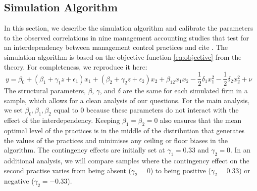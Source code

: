 \documentclass[12pt]{article}
\begin{document}
\subsection{Simulation Algorithm}

In this section, we describe the simulation algorithm and calibrate the parameters to the observed correlations in nine management accounting studies that test for an interdependency between management control practices and cite \citet{grabner_management_2013}. The simulation algorithm is based on the objective function \eqref{eq:objective} from the theory. For completeness, we reproduce it here:
\begin{equation*}
y  = \beta_0 + (\beta_{1} + \gamma_1 z + \epsilon_1) x_1 
						+ (\beta_{2} + \gamma_2 z  + \epsilon_2) x_2 
                        + \beta_{12} x_1 x_2 - \frac{1}{2}\delta_1 x^2_1 - \frac{1}{2}\delta_2 x^2_2 + \nu
\end{equation*}
The structural parameters, $\beta$, $\gamma$, and $\delta$ are the same for each simulated firm in a sample, which allows for a clean analysis of our questions. For the main analysis, we set $\beta_0, \beta_{1}, \beta_{2}$ equal to $0$ because these parameters do not interact with the effect of the interdependency. Keeping $\beta_{1} = \beta_{2} = 0$ also ensures that the mean optimal level of the practices is in the middle of the distribution that generates the values of the practices and minimises any ceiling or floor biases in the algorithm. The contingency effects are initially set at $\gamma_1 = 0.33$ and $\gamma_2 = 0$. In an additional analysis, we will compare samples where the contingency effect on the second practise varies from being absent ($\gamma_2 = 0$) to being positive ($\gamma_2 = 0.33$) or negative ($\gamma_2 = -0.33$).  
\end{document}

